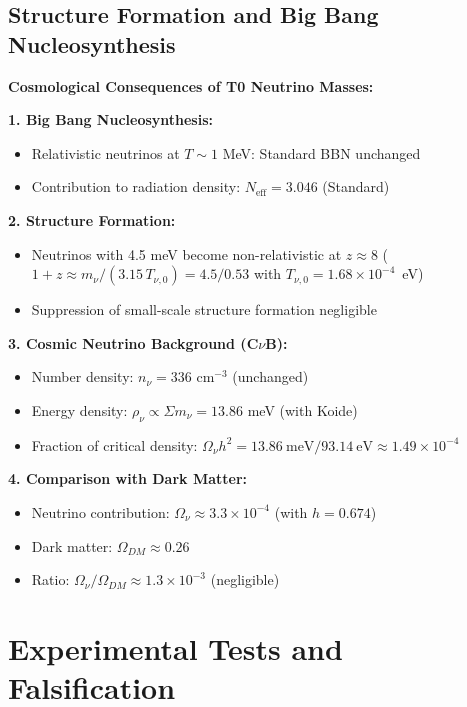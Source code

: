 	\subsection{Structure Formation and Big Bang Nucleosynthesis}
	
	\begin{keyresult}
		\textbf{Cosmological Consequences of T0 Neutrino Masses:}
		
		\textbf{1. Big Bang Nucleosynthesis:}
		\begin{itemize}
			\item Relativistic neutrinos at $T \sim 1$ MeV: Standard BBN unchanged
			\item Contribution to radiation density: $N_{\text{eff}} = 3.046$ (Standard)
		\end{itemize}
		
		\textbf{2. Structure Formation:}
		\begin{itemize}
			\item Neutrinos with 4.5 meV become non-relativistic at $z \approx 8$ ($1+z \approx m_\nu/(3.15\,T_{\nu,0}) = 4.5/0.53$ with $T_{\nu,0} = 1.68 \times 10^{-4}$~eV)
			\item Suppression of small-scale structure formation negligible
		\end{itemize}
		
		\textbf{3. Cosmic Neutrino Background (C$\nu$B):}
		\begin{itemize}
			\item Number density: $n_\nu = 336$ cm$^{-3}$ (unchanged)
			\item Energy density: $\rho_\nu \propto \Sigma m_\nu = 13.86$ meV (with Koide)
			\item Fraction of critical density: $\Omega_\nu h^2 = 13.86\ \text{meV}/93.14\ \text{eV} \approx 1.49 \times 10^{-4}$
		\end{itemize}
		
		\textbf{4. Comparison with Dark Matter:}
		\begin{itemize}
			\item Neutrino contribution: $\Omega_\nu \approx 3.3 \times 10^{-4}$ (with $h = 0.674$)
			\item Dark matter: $\Omega_{DM} \approx 0.26$
			\item Ratio: $\Omega_\nu/\Omega_{DM} \approx 1.3 \times 10^{-3}$ (negligible)
		\end{itemize}
	\end{keyresult}
	
	\section{Experimental Tests and Falsification}
	
